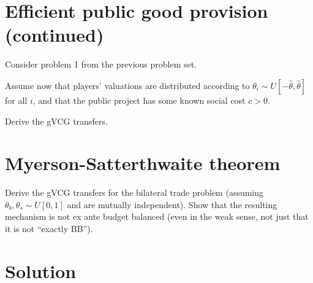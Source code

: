 \documentclass[a4paper]{article}
\newif\ifsolutions
\begin{document}
\section{Efficient public good provision (continued)}

Consider problem 1 from the previous problem set.

Assume now that players' valuations are distributed according to $\theta_i \sim U[-\hat{\theta},\hat{\theta}]$ for all $i$, and that the public project has some known social cost $c > 0$.

Derive the gVCG transfers.

\ifsolutions
\section*{Solution}
LCT for any $i$ is $\tilde{\theta}_i = -\hat{\theta}$ (you do not actually need to calculate the expectation to find it, since the expression that $\tilde{\theta}_i$ minimizes is weakly monotone in $\theta_i$ -- i.e., one of the edges of the support is the solution). The gVCG transfers are then given by
\begin{align*}
	t_i^{gVCG}(\theta) &= \max \left\{0, \sum_{j\neq i}\theta_j -\hat{\theta} - c \right\} - \left(\sum_{j\neq i}\theta_j -c\right) \cdot \mathbb{I} \left\{ \sum_{j=1}^N \theta_j - c > 0 \right\}
	\\
	&= \begin{cases}
		0	&	\text{ if } \sum_{j=1}^N \theta_j - c \leq 0,
		\\
		-\left(\sum_{j\neq i}\theta_j - c \right)	&	\text{ if }	\sum_{j\neq i} \theta_j - \hat{\theta} - c \leq 0 < \sum_{j=1}^N \theta_j - c,
		\\
		-\hat{\theta}	&	\text{ if } \sum_{j\neq i}\theta_j -\hat{\theta} - c > 0.
	\end{cases}
\end{align*}
\fi



\section{Myerson-Satterthwaite theorem}

	Derive the gVCG transfers for the bilateral trade problem (assuming $\theta_b,\theta_s \sim U[0,1]$ and are mutually independent). Show that the resulting mechanism is not ex ante budget balanced (even in the weak sense, not just that it is not ``exactly BB'').

\ifsolutions
\section*{Solution}
\end{document}
